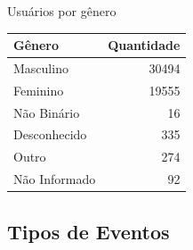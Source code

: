 \begin{quadro}[htb]
	\caption{Usuários por gênero}
	\label{quadro:usersbygender}
	\centering
	\begin{tabular}{|l|r|}
		\hline
		\textbf{Gênero} & \textbf{Quantidade} \\
		\hline
		Masculino       & 30494               \\
		Feminino        & 19555               \\
		Não Binário     & 16                  \\
		Desconhecido    & 335                 \\
		Outro           & 274                 \\
		Não Informado   & 92                  \\
		\hline
	\end{tabular}
\end{quadro}

\subsection*{Tipos de Eventos}

